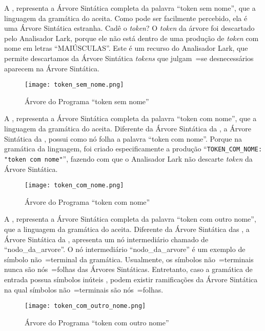 A ,
representa a Árvore Sintática completa da palavra ``token sem nome'',
que a linguagem da gramática do  aceita.
Como pode ser facilmente percebido,
ela é uma Árvore Sintática estranha.
Cadê o \textit{token}?
O \textit{token} da árvore foi descartado pelo Analisador Lark,
porque ele não está dentro de uma produção de \textit{token} com nome em letras ``MAIÚSCULAS''.
Este é um recurso do Analisador Lark,
que permite descartamos da Árvore Sintática \textit{tokens} que julgam~=se desnecessários aparecem na Árvore Sintática.
\begin{figure}[H]
\caption{Árvore do Programa ``token sem nome''}
\label{Figure:ArvoresDosTokens1}
\centering
\texttt{[image: token\_sem\_nome.png]}
\end{figure}

A ,
representa a Árvore Sintática completa da palavra ``token com nome'',
que a linguagem da gramática do  aceita.
Diferente da Árvore Sintática da ,
a Árvore Sintática da ,
possui como nó folha a palavra ``token com nome''.
Porque na gramática da linguagem,
foi criado especificamente a produção ``\texttt{TOKEN_COM_NOME:
"token com nome"}'',
fazendo com que o Analisador Lark não descarte \textit{token} da Árvore Sintática.
\begin{figure}[H]
\caption{Árvore do Programa ``token com nome''}
\label{Figure:ArvoresDosTokens2}
\centering
\texttt{[image: token\_com\_nome.png]}
\end{figure}

A ,
representa a Árvore Sintática completa da palavra ``token com outro nome'',
que a linguagem da gramática do  aceita.
Diferente da Árvore Sintática das ,
a Árvore Sintática da ,
apresenta um nó intermediário chamado de ``nodo\_da\_arvore''.
O nó intermediário ``nodo\_da\_arvore'' é um exemplo de símbolo não~=terminal da gramática.
Usualmente,
os símbolos não~=terminais nunca são nós~=folhas das Árvores Sintáticas.
Entretanto,
caso a gramática de entrada possua símbolos inúteis \cite{hopcroftBook},
podem existir ramificações da Árvore Sintática na qual símbolos não~=terminais são nós~=folhas.
\begin{figure}[H]
\caption{Árvore do Programa ``token com outro nome''}
\label{Figure:ArvoresDosTokens3}
\centering
\texttt{[image: token\_com\_outro\_nome.png]}
\end{figure}

